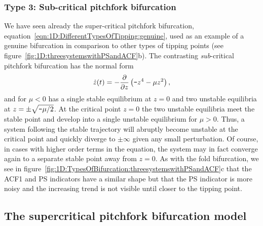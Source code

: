 {{	\subsubsection{Type 3: Sub-critical pitchfork bifurcation}
	We have seen already the super-critical pitchfork bifurcation, equation~\ref{eqn:1D:DifferentTypesOfTipping:genuine}, used as an example of a genuine bifurcation in comparison to other types of tipping points (see figure~\ref{fig:1D:threesystemswithPSandACF}b). The contrasting \emph{sub}-critical pitchfork bifurcation has the normal form
	\begin{equation}
	\label{eqn:1D:TypesOfBifurcation:sub-critical}
	\dot{z}(t)  = -\frac{\partial}{\partial z}\left(\textup{\texttt{-}} z^4 - \mu z^2\right),
	\end{equation}
	and for $\mu<0$ has a single stable equilibrium at $z=0$ and two unstable equilibria at $z=\pm\sqrt{\textup{\texttt{-}}\mu/2}$. At the critical point $z=0$ the two unstable equilibria meet the stable point and develop into a single unstable equilibrium for $\mu>0$. Thus, a system following the stable trajectory will abruptly become unstable at the critical point and quickly diverge to $\pm\infty$ given any small perturbation. Of course, in cases with higher order terms in the equation, the system may in fact converge again to a separate stable point away from $z=0$. As with the fold bifurcation, we see in figure~\ref{fig:1D:TypesOfBifurcation:threesystemswithPSandACF}c that the ACF1 and PS indicators have a similar shape but that the PS indicator is more noisy and the increasing trend is not visible until closer to the tipping point.

	
}

\subsection{The supercritical pitchfork bifurcation model}
 \label{subsec:1D:indicatorComparison:PitchforkModel}

{\Red{
}}}

